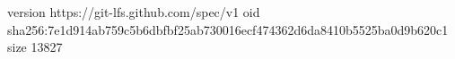 version https://git-lfs.github.com/spec/v1
oid sha256:7e1d914ab759c5b6dbfbf25ab730016ecf474362d6da8410b5525ba0d9b620c1
size 13827
